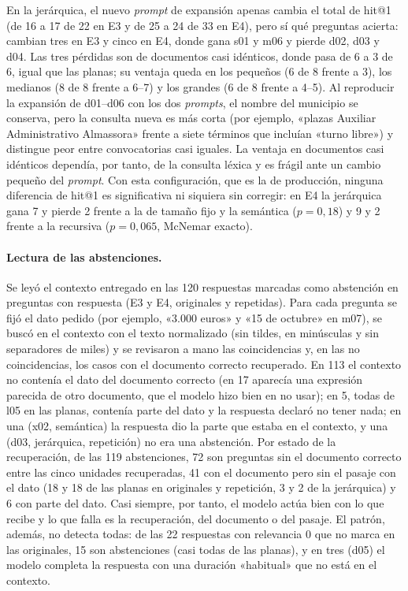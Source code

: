En la jerárquica, el nuevo \emph{prompt} de expansión apenas cambia el total de hit@1 (de 16 a 17 de 22 en E3 y de 25 a 24 de 33 en E4), pero sí qué preguntas acierta: cambian tres en E3 y cinco en E4, donde gana s01 y m06 y pierde d02, d03 y d04. Las tres pérdidas son de documentos casi idénticos, donde pasa de 6 a 3 de 6, igual que las planas; su ventaja queda en los pequeños (6 de 8 frente a 3), los medianos (8 de 8 frente a 6--7) y los grandes (6 de 8 frente a 4--5). Al reproducir la expansión de d01--d06 con los dos \emph{prompts}, el nombre del municipio se conserva, pero la consulta nueva es más corta (por ejemplo, «plazas Auxiliar Administrativo Almassora» frente a siete términos que incluían «turno libre») y distingue peor entre convocatorias casi iguales. La ventaja en documentos casi idénticos dependía, por tanto, de la consulta léxica y es frágil ante un cambio pequeño del \emph{prompt}. Con esta configuración, que es la de producción, ninguna diferencia de hit@1 es significativa ni siquiera sin corregir: en E4 la jerárquica gana 7 y pierde 2 frente a la de tamaño fijo y la semántica ($p = 0{,}18$) y 9 y 2 frente a la recursiva ($p = 0{,}065$, McNemar exacto).

\paragraph{Lectura de las abstenciones.} Se leyó el contexto entregado en las 120 respuestas marcadas como abstención en preguntas con respuesta (E3 y E4, originales y repetidas). Para cada pregunta se fijó el dato pedido (por ejemplo, «3.000 euros» y «15 de octubre» en m07), se buscó en el contexto con el texto normalizado (sin tildes, en minúsculas y sin separadores de miles) y se revisaron a mano las coincidencias y, en las no coincidencias, los casos con el documento correcto recuperado. En 113 el contexto no contenía el dato del documento correcto (en 17 aparecía una expresión parecida de otro documento, que el modelo hizo bien en no usar); en 5, todas de l05 en las planas, contenía parte del dato y la respuesta declaró no tener nada; en una (x02, semántica) la respuesta dio la parte que estaba en el contexto, y una (d03, jerárquica, repetición) no era una abstención. Por estado de la recuperación, de las 119 abstenciones, 72 son preguntas sin el documento correcto entre las cinco unidades recuperadas, 41 con el documento pero sin el pasaje con el dato (18 y 18 de las planas en originales y repetición, 3 y 2 de la jerárquica) y 6 con parte del dato. Casi siempre, por tanto, el modelo actúa bien con lo que recibe y lo que falla es la recuperación, del documento o del pasaje. El patrón, además, no detecta todas: de las 22 respuestas con relevancia 0 que no marca en las originales, 15 son abstenciones (casi todas de las planas), y en tres (d05) el modelo completa la respuesta con una duración «habitual» que no está en el contexto.

